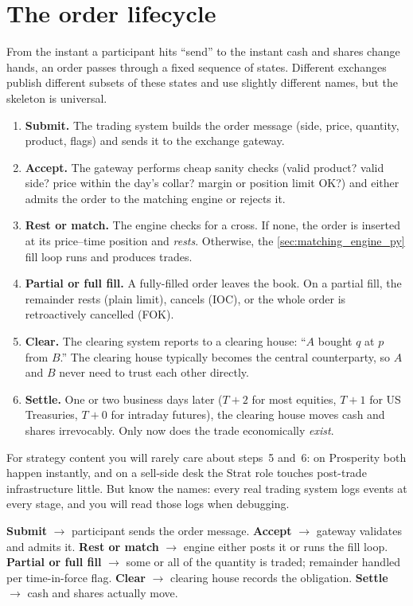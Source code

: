 \section{The order lifecycle}
\label{sec:lifecycle}

From the instant a participant hits ``send'' to the instant cash and
shares change hands, an order passes through a fixed sequence of
states. Different exchanges publish different subsets of these states
and use slightly different names, but the skeleton is universal.

\begin{enumerate}
  \item \textbf{Submit.} The trading system builds the order message
  (side, price, quantity, product, flags) and sends it to the
  exchange gateway.
  \item \textbf{Accept.} The gateway performs cheap sanity checks
  (valid product? valid side? price within the day's collar? margin
  or position limit OK?) and either admits the order to the matching
  engine or rejects it.
  \item \textbf{Rest or match.} The engine checks for a cross. If
  none, the order is inserted at its price--time position and
  \emph{rests}. Otherwise, the \cref{sec:matching_engine_py} fill
  loop runs and produces trades.
  \item \textbf{Partial or full fill.} A fully-filled order leaves
  the book. On a partial fill, the remainder rests (plain limit),
  cancels (IOC), or the whole order is retroactively cancelled
  (FOK).
  \item \textbf{Clear.} The clearing system reports to a clearing
  house: ``$A$ bought $q$ at $p$ from $B$.'' The clearing house
  typically becomes the central counterparty, so $A$ and $B$ never
  need to trust each other directly.
  \item \textbf{Settle.} One or two business days later ($T{+}2$ for
  most equities, $T{+}1$ for US Treasuries, $T{+}0$ for intraday
  futures), the clearing house moves cash and shares irrevocably.
  Only now does the trade economically \emph{exist}.
\end{enumerate}

For strategy content you will rarely care about steps~5 and~6: on
Prosperity both happen instantly, and on a sell-side desk the Strat
role touches post-trade infrastructure little. But know the names:
every real trading system logs events at every stage, and you will
read those logs when debugging.

\begin{keyfactbox}
\textbf{Submit} $\to$ participant sends the order message.
\textbf{Accept} $\to$ gateway validates and admits it.
\textbf{Rest or match} $\to$ engine either posts it or runs the fill
loop. \textbf{Partial or full fill} $\to$ some or all of the quantity
is traded; remainder handled per time-in-force flag.
\textbf{Clear} $\to$ clearing house records the obligation.
\textbf{Settle} $\to$ cash and shares actually move.
\end{keyfactbox}

